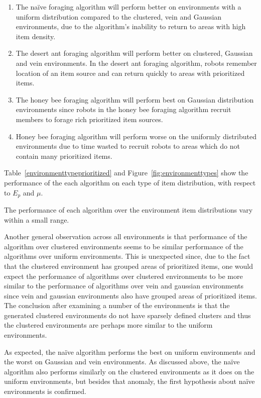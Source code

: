\begin{enumerate}
	\item The na\"ive foraging algorithm will perform better on environments with a uniform distribution compared to the clustered, vein and Gaussian environments, due to the algorithm's inability to return to areas with high item density. 
	
	\item The desert ant foraging algorithm will perform better on clustered, Gaussian and vein environments. In the desert ant foraging algorithm, robots remember location of an item source and can return quickly to areas with prioritized items.
	
	 \item The honey bee foraging algorithm will perform best on Gaussian distribution environments since robots in the honey bee foraging algorithm recruit members to forage rich prioritized item sources. 
	 
	 \item Honey bee foraging algorithm will perform worse on the uniformly distributed environments due to time wasted to recruit robots to areas which do not contain many prioritized items.
\end{enumerate}

Table~\ref{environmenttypeprioritized} and Figure~\ref{fig:environmenttypes} show the performance of the each algorithm on each type of item distribution, with respect to $E_p$ and $\mu$. 

The performance  of each algorithm over the environment item distributions vary within a small range. 
 
 Another general observation across all environments is that performance of the algorithm over clustered environments seems to be similar performance of the algorithms over uniform environments. This is unexpected since, due to the fact that the clustered environment has grouped areas of prioritized items, one would expect the performance of algorithms over clustered environments to be more similar to the performance of algorithms over vein and gaussian environments since vein and gaussian environments also have grouped areas of prioritized items. The conclusion after examining a number of the environments is that the generated clustered environments do not have sparsely defined clusters and thus the clustered environments are perhaps more similar to the uniform environments. 

As expected, the na\"ive algorithm performs the best on uniform environments and the worst on Gaussian and vein environments. As discussed above, the na\"ive algorithm also performs similarly on the clustered environments as it does on the uniform environments, but besides that anomaly, the first hypothesis about na\"ive environments is confirmed. 

